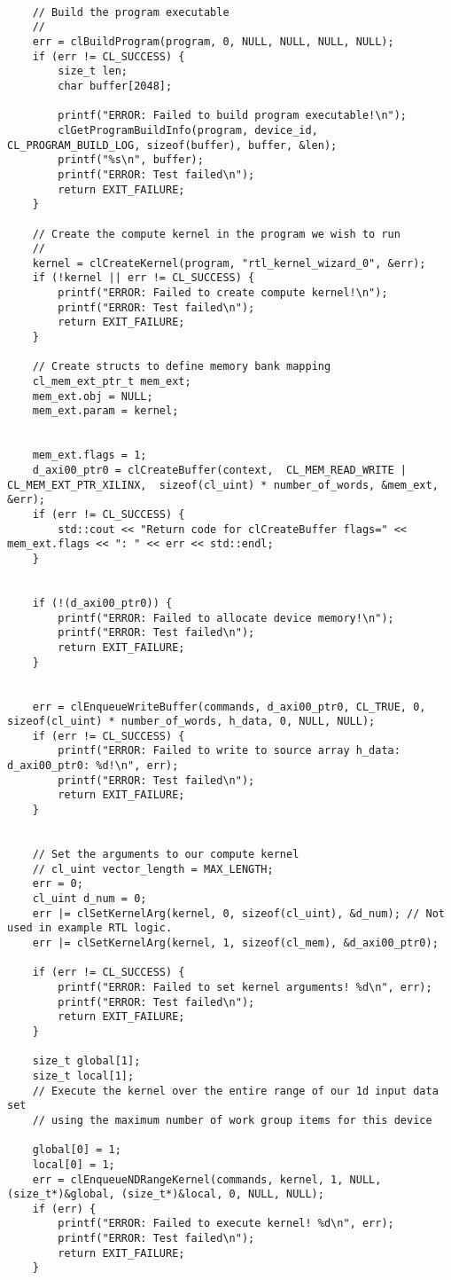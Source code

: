 \begin{lstlisting}[label=lst:lev_rec,caption=Содержимое файла host\_example.cpp]
	
	// Build the program executable
	//
	err = clBuildProgram(program, 0, NULL, NULL, NULL, NULL);
	if (err != CL_SUCCESS) {
		size_t len;
		char buffer[2048];
		
		printf("ERROR: Failed to build program executable!\n");
		clGetProgramBuildInfo(program, device_id, CL_PROGRAM_BUILD_LOG, sizeof(buffer), buffer, &len);
		printf("%s\n", buffer);
		printf("ERROR: Test failed\n");
		return EXIT_FAILURE;
	}
	
	// Create the compute kernel in the program we wish to run
	//
	kernel = clCreateKernel(program, "rtl_kernel_wizard_0", &err);
	if (!kernel || err != CL_SUCCESS) {
		printf("ERROR: Failed to create compute kernel!\n");
		printf("ERROR: Test failed\n");
		return EXIT_FAILURE;
	}
	
	// Create structs to define memory bank mapping
	cl_mem_ext_ptr_t mem_ext;
	mem_ext.obj = NULL;
	mem_ext.param = kernel;
	
	
	mem_ext.flags = 1;
	d_axi00_ptr0 = clCreateBuffer(context,  CL_MEM_READ_WRITE | CL_MEM_EXT_PTR_XILINX,  sizeof(cl_uint) * number_of_words, &mem_ext, &err);
	if (err != CL_SUCCESS) {
		std::cout << "Return code for clCreateBuffer flags=" << mem_ext.flags << ": " << err << std::endl;
	}
	
	
	if (!(d_axi00_ptr0)) {
		printf("ERROR: Failed to allocate device memory!\n");
		printf("ERROR: Test failed\n");
		return EXIT_FAILURE;
	}
	
	
	err = clEnqueueWriteBuffer(commands, d_axi00_ptr0, CL_TRUE, 0, sizeof(cl_uint) * number_of_words, h_data, 0, NULL, NULL);
	if (err != CL_SUCCESS) {
		printf("ERROR: Failed to write to source array h_data: d_axi00_ptr0: %d!\n", err);
		printf("ERROR: Test failed\n");
		return EXIT_FAILURE;
	}
	
	
	// Set the arguments to our compute kernel
	// cl_uint vector_length = MAX_LENGTH;
	err = 0;
	cl_uint d_num = 0;
	err |= clSetKernelArg(kernel, 0, sizeof(cl_uint), &d_num); // Not used in example RTL logic.
	err |= clSetKernelArg(kernel, 1, sizeof(cl_mem), &d_axi00_ptr0); 
	
	if (err != CL_SUCCESS) {
		printf("ERROR: Failed to set kernel arguments! %d\n", err);
		printf("ERROR: Test failed\n");
		return EXIT_FAILURE;
	}
	
	size_t global[1];
	size_t local[1];
	// Execute the kernel over the entire range of our 1d input data set
	// using the maximum number of work group items for this device
	
	global[0] = 1;
	local[0] = 1;
	err = clEnqueueNDRangeKernel(commands, kernel, 1, NULL, (size_t*)&global, (size_t*)&local, 0, NULL, NULL);
	if (err) {
		printf("ERROR: Failed to execute kernel! %d\n", err);
		printf("ERROR: Test failed\n");
		return EXIT_FAILURE;
	}
	

\end{lstlisting}
